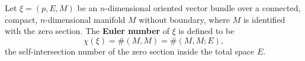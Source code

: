 Let $\xi = (p, E, M)$ be an $n$-dimensional oriented vector bundle over a connected, compact, $n$-dimensional manifold $M$ without boundary, where $M$ is identified with the zero section. The \textbf{Euler number} of $\xi$ is defined to be
$$
\chi(\xi) = \#(M, M) = \#(M, M; E),
$$
the self-intersection number of the zero section inside the total space $E$.
